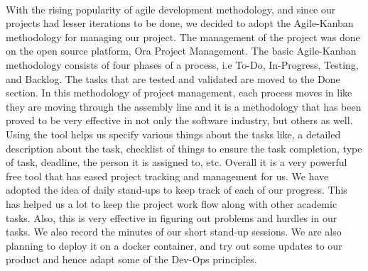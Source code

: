 \documentclass[a4paper,12pt]{report}
\begin{document}
\paragraph{}
With the rising popularity of agile development methodology, and since our projects had lesser iterations to be done, we decided to adopt the Agile-Kanban methodology for managing our project. The management of the project was done on the open source platform, Ora Project Management. The basic Agile-Kanban methodology consists of four phases of a process, i.e To-Do, In-Progress, Testing, and Backlog. The tasks that are tested and validated are moved to the Done section. In this methodology of project management, each process moves in like they are moving through the assembly line and it is a methodology that has been proved to be very effective in not only the software industry, but others as well. Using the tool helps us specify various things about the tasks like, a detailed description about the task, checklist of things to ensure the task completion, type of task, deadline, the person it is assigned to, etc. Overall it is a very powerful free tool that has eased project tracking and management for us. We have adopted the idea of daily stand-ups to keep track of each of our progress. This has helped us a lot to keep the project work flow along with other academic tasks. Also, this is very effective in figuring out problems and hurdles in our tasks. We also record the minutes of our short stand-up sessions. We are also planning to deploy it on a docker container, and try out some updates to our product and hence adapt some of the Dev-Ops principles.

\newpage
\renewcommand\chaptername{CHAPTER}
\end{document}
